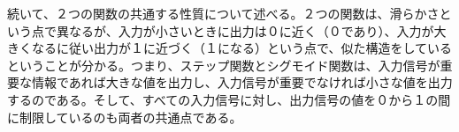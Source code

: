 \documentclass[dvipdfmx]{jsarticle}
\begin{document}
続いて、２つの関数の共通する性質について述べる。２つの関数は、滑らかさという点で異なるが、入力が小さいときに出力は０に近く（０であり）、入力が大きくなるに従い出力が１に近づく（１になる）という点で、似た構造をしているということが分かる。つまり、ステップ関数とシグモイド関数は、入力信号が重要な情報であれば大きな値を出力し、入力信号が重要でなければ小さな値を出力するのである。そして、すべての入力信号に対し、出力信号の値を０から１の間に制限しているのも両者の共通点である。
\end{document}
